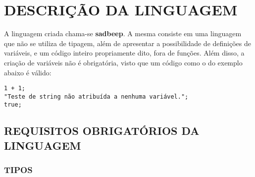 \section{\normalsize DESCRIÇÃO DA LINGUAGEM}

	A linguagem criada chama-se \textbf{sadbeep}. A mesma consiste em uma linguagem que não se utiliza de tipagem, além de apresentar a possibilidade de definições de variáveis, e um código inteiro propriamente dito, fora de funções. Além disso, a criação de variáveis não é obrigatória, visto que um código como o do exemplo abaixo é válido:

    \begin{lstlisting}
1 + 1;
"Teste de string não atribuída a nenhuma variável.";
true;
    \end{lstlisting}

    \subsection{\normalsize REQUISITOS OBRIGATÓRIOS DA LINGUAGEM}
        
        \subsubsection{\normalsize TIPOS}
            
